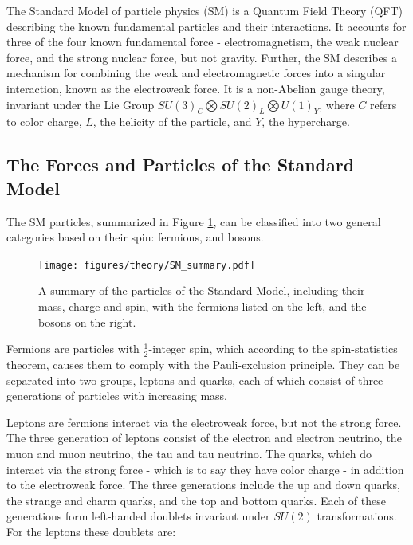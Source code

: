 
The Standard Model of particle physics (SM) is a Quantum Field Theory (QFT) describing the known fundamental particles and their interactions. It accounts for three of the four known fundamental force - electromagnetism, the weak nuclear force, and the strong nuclear force, but not gravity. Further, the SM describes a mechanism for combining the weak and electromagnetic forces into a singular interaction, known as the electroweak force. It is a non-Abelian gauge theory, invariant under the Lie Group $SU(3)_C\bigotimes SU(2)_L\bigotimes U(1)_Y$, where $C$ refers to color charge, $L$, the helicity of the particle, and $Y$, the hypercharge.

\subsection{The Forces and Particles of the Standard Model}
\label{sec:forcesParticles}

The SM particles, summarized in Figure \ref{fig:SM_summary}, can be classified into two general categories based on their spin: fermions, and bosons. 

\begin{figure}[H]
\centering
   \texttt{[image: figures/theory/SM\_summary.pdf]}
\caption{A summary of the particles of the Standard Model, including their mass, charge and spin, with the fermions listed on the left, and the bosons on the right. \cite{oerter2006the}}
\label{fig:SM_summary}
\end{figure}

Fermions are particles with $\frac{1}{2}$-integer spin, which according to the spin-statistics theorem, causes them to comply with the Pauli-exclusion principle. They can be separated into two groups, leptons and quarks, each of which consist of three generations of particles with increasing mass.

Leptons are fermions interact via the electroweak force, but not the strong force. The three generation of leptons consist of the electron and electron neutrino, the muon and muon neutrino, the tau and tau neutrino. The quarks, which do interact via the strong force - which is to say they have color charge - in addition to the electroweak force. The three generations include the up and down quarks, the strange and charm quarks, and the top and bottom quarks. Each of these generations form left-handed doublets invariant under $SU(2)$ transformations. For the leptons these doublets are:

